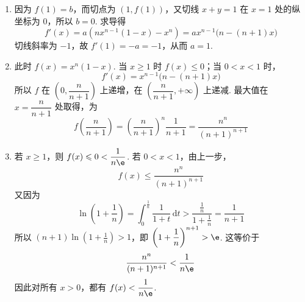 \begin{solution}
\begin{enumerate}
\item 因为 \(f(1)=b\)，而切点为 \((1,f(1))\)，又切线 \(x+y=1\) 在 \(x=1\) 处的纵坐标为 \(0\)，所以 \(b=0\). 求导得
\[
f'(x)=a\left(nx^{n-1}(1-x)-x^n\right)=a x^{n-1}\bigl(n-(n+1)x\bigr)
\]
切线斜率为 \(-1\)，故 \(f'(1)=-a=-1\)，从而 \(a=1\).

\item 此时 \(f(x)=x^n(1-x)\). 当 \(x\geqslant1\) 时 \(f(x)\leqslant0\)；当 \(0<x<1\) 时，
\[
f'(x)=x^{n-1}\bigl(n-(n+1)x\bigr)
\]
所以 \(f\) 在 \(\left(0,\dfrac n{n+1}\right)\) 上递增，在 \(\left(\dfrac n{n+1},+\infty\right)\) 上递减. 最大值在 \(x=\dfrac n{n+1}\) 处取得，为
\[
f\left(\frac n{n+1}\right)=\left(\frac n{n+1}\right)^n\frac1{n+1}=\frac{n^n}{(n+1)^{n+1}}
\]

\item 若 \(x\geqslant1\)，则 \(f(x)\leqslant0<\dfrac1{n\e}\). 若 \(0<x<1\)，由上一步，
\[
f(x)\leqslant\frac{n^n}{(n+1)^{n+1}}
\]
又因为
\[
\ln\left(1+\frac1n\right)=\int_{0}^{\frac{1}{n}}\frac{1}{1+t}\,\mathrm dt>\frac{\frac{1}{n}}{1+\frac{1}{n}}=\frac1{n+1}
\]
所以 \((n+1)\ln(1+\frac{1}{n})>1\)，即 \(\left(1+\dfrac1n\right)^{n+1}>\e\). 这等价于
\[
\frac{n^n}{(n+1)^{n+1}}<\frac1{n\e}
\]
因此对所有 \(x>0\)，都有 \(f(x)<\dfrac1{n\e}\).
\end{enumerate}
\end{solution}
